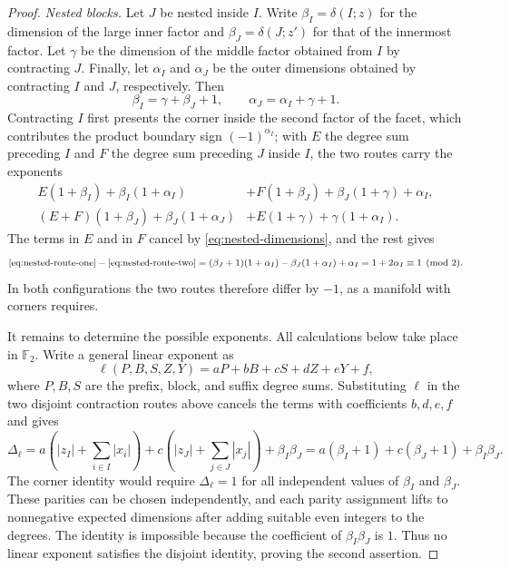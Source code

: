 \documentclass[11pt,letterpaper,twoside]{article}
\theoremstyle{plain}
\theoremstyle{definition}
\theoremstyle{remark}
\begin{document}
\begin{proof}
\emph{Nested blocks.}  Let \(J\) be nested inside \(I\).  Write \(\beta_I=\delta(I;z)\) for the dimension of the large inner factor and \(\beta_J=\delta(J;z')\) for that of the innermost factor.  Let \(\gamma\) be the dimension of the middle factor obtained from \(I\) by contracting \(J\).  Finally, let \(\alpha_I\) and \(\alpha_J\) be the outer dimensions obtained by contracting \(I\) and \(J\), respectively.  Then
\begin{equation}\label{eq:nested-dimensions}
 \beta_I=\gamma+\beta_J+1,
 \qquad
 \alpha_J=\alpha_I+\gamma+1.
\end{equation}
Contracting \(I\) first presents the corner inside the second factor of the facet, which contributes the product boundary sign \((-1)^{\alpha_I}\); with \(E\) the degree sum preceding \(I\) and \(F\) the degree sum preceding \(J\) inside \(I\), the two routes carry the exponents
\begin{align}
 \label{eq:nested-route-one}
 E(1+\beta_I)+\beta_I(1+\alpha_I)
 &+F(1+\beta_J)+\beta_J(1+\gamma)+\alpha_I,\\
 \label{eq:nested-route-two}
 (E+F)(1+\beta_J)+\beta_J(1+\alpha_J)
 &+E(1+\gamma)+\gamma(1+\alpha_I).
\end{align}
The terms in \(E\) and in \(F\) cancel by \eqref{eq:nested-dimensions}, and the rest gives
\begin{equation}\label{eq:nested-difference}
 \eqref{eq:nested-route-one}-\eqref{eq:nested-route-two}
 =(\beta_J+1)(1+\alpha_I)-\beta_J(1+\alpha_I)+\alpha_I
 =1+2\alpha_I
 \equiv1\pmod2.
\end{equation}
In both configurations the two routes therefore differ by \(-1\), as a manifold with corners requires.

It remains to determine the possible exponents.  All calculations below take place in \(\mathbb F_2\).  Write a general linear exponent as
\[
 \ell(P,B,S,Z,Y)=aP+bB+cS+dZ+eY+f,
\]
where \(P,B,S\) are the prefix, block, and suffix degree sums.  Substituting \(\ell\) in the two disjoint contraction routes above cancels the terms with coefficients \(b,d,e,f\) and gives
\[
 \Delta_\ell
 =a\left(|z_I|+\sum_{i\in I}|x_i|\right)
  +c\left(|z_J|+\sum_{j\in J}|x_j|\right)
  +\beta_I\beta_J
 =a(\beta_I+1)+c(\beta_J+1)+\beta_I\beta_J.
\]
The corner identity would require \(\Delta_\ell=1\) for all independent values of \(\beta_I\) and \(\beta_J\).  These parities can be chosen independently, and each parity assignment lifts to nonnegative expected dimensions after adding suitable even integers to the degrees.  The identity is impossible because the coefficient of \(\beta_I\beta_J\) is \(1\).  Thus no linear exponent satisfies the disjoint identity, proving the second assertion.


\end{proof}
\end{document}

